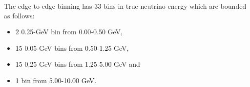 The \nue edge-to-edge binning has 33 bins in true neutrino energy which are bounded as follows:
\begin{itemize}
    \item 2 0.25-GeV bin from 0.00-0.50 GeV,
    \item 15 0.05-GeV bins from 0.50-1.25 GeV,
    \item 15 0.25-GeV bins from 1.25-5.00 GeV and
    \item 1 bin from 5.00-10.00 GeV.
\end{itemize}


